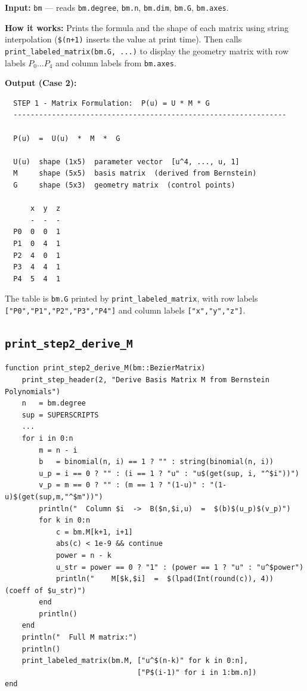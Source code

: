 \documentclass[12pt, a4paper]{article}
\newcommand{\cd}[1]{\texttt{#1}}
\begin{document}
\textbf{Input:} \cd{bm} --- reads \cd{bm.degree}, \cd{bm.n},
\cd{bm.dim}, \cd{bm.G}, \cd{bm.axes}.

\textbf{How it works:}
Prints the formula and the shape of each matrix using
string interpolation (\cd{\$(n+1)} inserts the value at
print time).
Then calls \cd{print\_labeled\_matrix(bm.G, ...)} to display
the geometry matrix with row labels $P_0 \ldots P_4$
and column labels from \cd{bm.axes}.

\textbf{Output (Case 2):}
\begin{verbatim}
  STEP 1 - Matrix Formulation:  P(u) = U * M * G
  ----------------------------------------------------------------

  P(u)  =  U(u)  *  M  *  G

  U(u)  shape (1x5)  parameter vector  [u^4, ..., u, 1]
  M     shape (5x5)  basis matrix  (derived from Bernstein)
  G     shape (5x3)  geometry matrix  (control points)

      x  y  z
      -  -  -
  P0  0  0  1
  P1  0  4  1
  P2  4  0  1
  P3  4  4  1
  P4  5  4  1
\end{verbatim}

The table is \cd{bm.G} printed by \cd{print\_labeled\_matrix},
with row labels \cd{["P0","P1","P2","P3","P4"]}
and column labels \cd{["x","y","z"]}.

\subsection{\texttt{print\_step2\_derive\_M}}

\begin{verbatim}
function print_step2_derive_M(bm::BezierMatrix)
    print_step_header(2, "Derive Basis Matrix M from Bernstein Polynomials")
    n   = bm.degree
    sup = SUPERSCRIPTS
    ...
    for i in 0:n
        m = n - i
        b   = binomial(n, i) == 1 ? "" : string(binomial(n, i))
        u_p = i == 0 ? "" : (i == 1 ? "u" : "u$(get(sup, i, "^$i"))")
        v_p = m == 0 ? "" : (m == 1 ? "(1-u)" : "(1-u)$(get(sup,m,"^$m"))")
        println("  Column $i  ->  B($n,$i,u)  =  $(b)$(u_p)$(v_p)")
        for k in 0:n
            c = bm.M[k+1, i+1]
            abs(c) < 1e-9 && continue
            power = n - k
            u_str = power == 0 ? "1" : (power == 1 ? "u" : "u^$power")
            println("    M[$k,$i]  =  $(lpad(Int(round(c)), 4))   (coeff of $u_str)")
        end
        println()
    end
    println("  Full M matrix:")
    println()
    print_labeled_matrix(bm.M, ["u^$(n-k)" for k in 0:n],
                               ["P$(i-1)" for i in 1:bm.n])
end
\end{verbatim}
\end{document}
